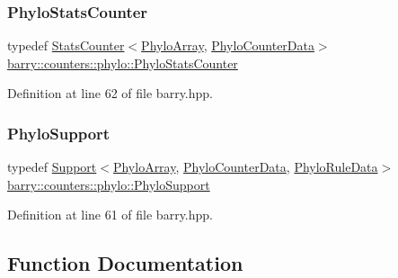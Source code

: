 \subsubsection{\texorpdfstring{Phylo\+Stats\+Counter}{PhyloStatsCounter}}
{\footnotesize\ttfamily typedef \hyperlink{classbarry_1_1_stats_counter}{Stats\+Counter}$<$\hyperlink{namespacebarry_1_1counters_1_1phylo_abd293bf65e494e903639fb5fb2c91604}{Phylo\+Array}, \hyperlink{namespacebarry_1_1counters_1_1phylo_a6ecc0d8ab76f8dc2db152221a8e9e95a}{Phylo\+Counter\+Data}$>$ \hyperlink{namespacebarry_1_1counters_1_1phylo_abfefb6cff81a19d278b306a79cc011a3}{barry\+::counters\+::phylo\+::\+Phylo\+Stats\+Counter}}



Definition at line 62 of file barry.\+hpp.

\mbox{\label{namespacebarry_1_1counters_1_1phylo_a29ed06e87d808c2e7d333aa00a0643b5}} 
\subsubsection{\texorpdfstring{Phylo\+Support}{PhyloSupport}}
{\footnotesize\ttfamily typedef \hyperlink{classbarry_1_1_support}{Support}$<$\hyperlink{namespacebarry_1_1counters_1_1phylo_abd293bf65e494e903639fb5fb2c91604}{Phylo\+Array}, \hyperlink{namespacebarry_1_1counters_1_1phylo_a6ecc0d8ab76f8dc2db152221a8e9e95a}{Phylo\+Counter\+Data}, \hyperlink{namespacebarry_1_1counters_1_1phylo_a5da540950bcf3372bcedb17a5b23667c}{Phylo\+Rule\+Data}$>$ \hyperlink{namespacebarry_1_1counters_1_1phylo_a29ed06e87d808c2e7d333aa00a0643b5}{barry\+::counters\+::phylo\+::\+Phylo\+Support}}



Definition at line 61 of file barry.\+hpp.



\subsection{Function Documentation}
\mbox{\label{namespacebarry_1_1counters_1_1phylo_a002286f13261eb4633c6dc9e6fc1212b}} 
